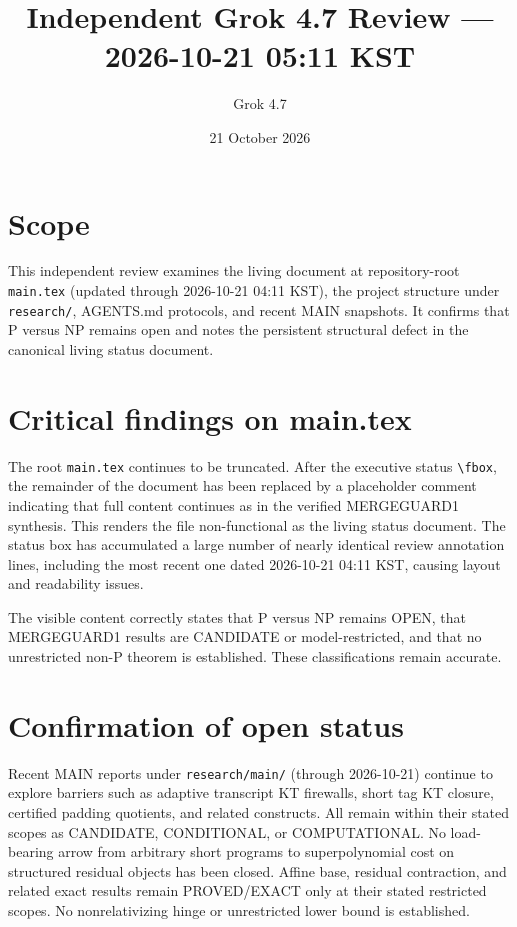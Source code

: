 \documentclass[11pt]{article}
\title{Independent Grok 4.7 Review --- 2026-10-21 05:11 KST}
\author{Grok 4.7}
\date{21 October 2026}
\begin{document}
\maketitle

\begin{center}
\end{center}

\section{Scope}
This independent review examines the living document at repository-root \texttt{main.tex} (updated through 2026-10-21 04:11 KST), the project structure under \texttt{research/}, AGENTS.md protocols, and recent MAIN snapshots. It confirms that P versus NP remains open and notes the persistent structural defect in the canonical living status document.

\section{Critical findings on main.tex}
The root \texttt{main.tex} continues to be truncated. After the executive status \texttt{\textbackslash fbox}, the remainder of the document has been replaced by a placeholder comment indicating that full content continues as in the verified MERGEGUARD1 synthesis. This renders the file non-functional as the living status document. The status box has accumulated a large number of nearly identical review annotation lines, including the most recent one dated 2026-10-21 04:11 KST, causing layout and readability issues.

The visible content correctly states that P versus NP remains OPEN, that MERGEGUARD1 results are CANDIDATE or model-restricted, and that no unrestricted non-P theorem is established. These classifications remain accurate.

\section{Confirmation of open status}
Recent MAIN reports under \texttt{research/main/} (through 2026-10-21) continue to explore barriers such as adaptive transcript KT firewalls, short tag KT closure, certified padding quotients, and related constructs. All remain within their stated scopes as CANDIDATE, CONDITIONAL, or COMPUTATIONAL. No load-bearing arrow from arbitrary short programs to superpolynomial cost on structured residual objects has been closed. Affine base, residual contraction, and related exact results remain PROVED/EXACT only at their stated restricted scopes. No nonrelativizing hinge or unrestricted lower bound is established.
\end{document}
